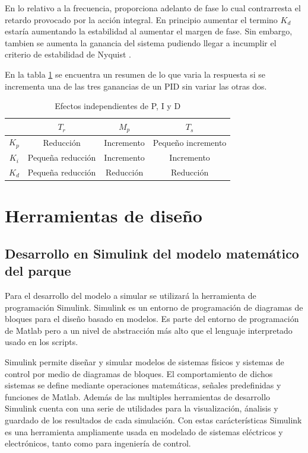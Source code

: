 \documentclass{book}
\begin{document}
En lo relativo a la frecuencia, proporciona adelanto de fase lo cual contrarresta el retardo provocado por la acci\'on integral. En principio aumentar el termino $K_d$ estar\'ia aumentando la estabilidad al aumentar el margen de fase. Sin embargo, tambien se aumenta la ganancia del sistema pudiendo llegar a incumplir el criterio de estabilidad de Nyquist \cite{PIDtunning}.\par

En la tabla \ref{ta:tuning} se encuentra un resumen de lo que varia la respuesta si se incrementa una de las tres ganancias de un PID sin variar las otras dos. \par

\begin{table}[h!]
\centering
\caption{Efectos independientes de P, I y D \cite{PIDtunning}}
\label{ta:tuning}
\begin{tabular}{c|ccc}
	 & $T_r$    & $M_p$ & $T_s$ \\ \hline
$K_p$         & Reducci\'on   & Incremento     & Pequeño incremento          \\
$K_i$        & Pequeña reducci\'on & Incremento       & Incremento          \\
$K_d$        & Pequeña reducci\'on & Reducci\'on     & Reducci\'on      
\end{tabular}
\end{table}


\chapter{Herramientas de diseño}


	\section{Desarrollo en Simulink del modelo matem\'atico del parque}

Para el desarrollo del modelo a simular se utilizar\'a la herramienta de programaci\'on Simulink. Simulink es un entorno de programaci\'on de diagramas de bloques para el diseño basado en modelos. Es parte del entorno de programaci\'on de Matlab pero a un nivel de abstracci\'on m\'as alto que el lenguaje interpretado usado en los scripts. \par

Simulink permite diseñar y simular modelos de sistemas f\'isicos y sistemas de control por medio de diagramas de bloques. El comportamiento de dichos sistemas se define mediante operaciones matem\'aticas, señales predefinidas y funciones de Matlab. Adem\'as de las multiples herramientas de desarrollo Simulink cuenta con una serie de utilidades para la visualizaci\'on, \'analisis y guardado de los resultados de cada simulaci\'on. Con estas car\'acter\'isticas Simulink es una herramienta ampliamente usada en modelado de sistemas el\'ectricos y electr\'onicos, tanto como para ingenier\'ia de control. \par
\end{document}
